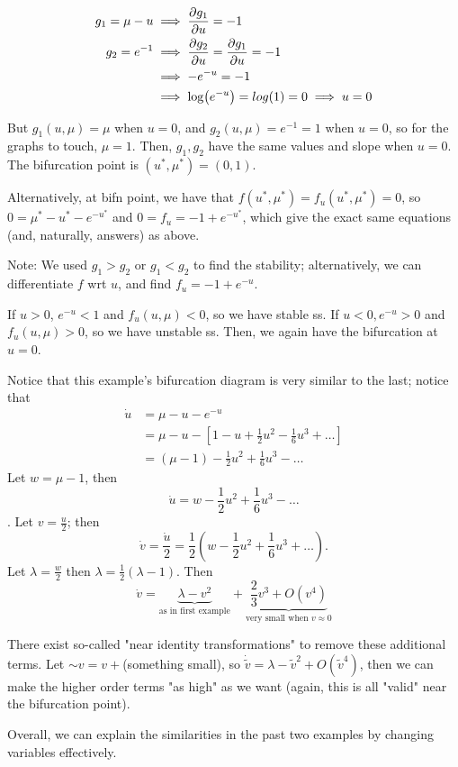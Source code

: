 \documentclass[12pt, oneside]{article}
\begin{document}
\begin{example}
  \begin{align*}
    g_1 = \mu - u &\implies \pdv{g_1}{u} = -1\\
    g_2 = e^{-1} &\implies \pdv{g_2}{u} = \pdv{g_1}{u} = -1\\
   & \implies - e^{-u} = -1\\
    &\implies \log (e^{-u}) = log (1) = 0 \implies u = 0
  \end{align*}

  But $g_1(u, \mu)  = \mu$ when $u = 0$, and $g_2(u, \mu) = e^{-1} = 1$ when $u = 0$, so for the graphs to touch, $\mu = 1$. Then, $g_1, g_2$ have the same values and slope when $u = 0$. The bifurcation point is $(u^*, \mu^*) = (0,1)$.

  Alternatively, at bifn point, we have that $f(u^*, \mu^*) = f_u(u^*, \mu^*) = 0$, so $0 = \mu^{*} - u^{*} - e^{-u^*}$ and $0 = f_u = -1 + e^{-u^*}$, which give the exact same equations (and, naturally, answers) as above.

  Note: We used $g_1 > g_2$ or $g_1 < g_2$ to find the stability; alternatively, we can differentiate $f$ wrt $u$, and find $f_u = -1 + e^{-u}$.

  If $u > 0$, $e^{-u} < 1$ and $f_u(u, \mu) < 0$, so we have stable ss. If $u < 0, e^{-u} > 0$ and $f_u(u, \mu) > 0$, so we have unstable ss. Then, we again have the bifurcation at $u = 0$.
\end{example}

\begin{remark}
  Notice that this example's bifurcation diagram is very similar to the last; notice that \begin{align*}
    \dot{u} &= \mu - u - e^{-u}\\
&= \mu - u -[1-u+\frac{1}{2}u^2 - \frac{1}{6}u^3 + \dots]\\
&= (\mu - 1) - \frac{1}{2}u^2 + \frac{1}{6}u^3 - \dots
  \end{align*}
  Let $w = \mu - 1$, then $$\dot{u} = w - \frac{1}{2}u^2 + \frac{1}{6}u^3 - \dots$$. Let $v = \frac{u}{2}$; then $$\dot{v} = \frac{\dot{u}}{2} = \frac{1}{2}\left(w - \frac{1}{2}u^2 + \frac{1}{6}u^3 + \dots \right).$$
  Let $\lambda = \frac{w}{2}$ then $\lambda = \frac{1}{2}(\lambda - 1)$. Then $$\dot{v} = \underbrace{\lambda - v^2}_{\text{as in first example}} + \underbrace{\frac{2}{3}v^3 + O(v^4)}_{\text{very small when $v \approx 0$}}$$
\end{remark}
\begin{remark}[aside]
  There exist so-called "near identity transformations" to remove these additional terms. Let $\sim v = v + $(something small), so $\dot{\tilde{v}}= \lambda - \tilde{v}^2 + O(\tilde{v}^4)$, then we can make the higher order terms "as high" as we want (again, this is all "valid" near the bifurcation point).

  Overall, we can explain the similarities in the past two examples by changing variables effectively.
\end{remark}
\end{document}
